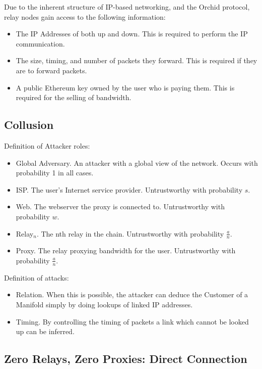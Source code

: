 \documentclass{article}
\newcommand{\mesh}{Orchid}
\begin{document}
Due to the inherent structure of IP-based networking, and the \mesh{} protocol, relay nodes gain access to the following information:

\begin{itemize}
\item The IP Addresses of both up and down. This is required to perform the IP communication.
\item The size, timing, and number of packets they forward. This is required if they are to forward packets.
\item A public Ethereum key owned by the user who is paying them. This is required for the selling of bandwidth.
\end{itemize}

\subsection{Collusion}
\label{sec:collusion}

Definition of Attacker roles:

\begin{itemize}
\item Global Adversary. An attacker with a global view of the network. Occurs with probability 1 in all cases.
\item ISP. The user's Internet service provider. Untrustworthy with probability $s$.
\item Web. The webserver the proxy is connected to. Untrustworthy with probability $w$.
\item Relay$_n$. The nth relay in the chain. Untrustworthy with probability $\frac{a}{n}$.
\item Proxy. The relay proxying bandwidth for the user. Untrustworthy with probability $\frac{a}{n}$.
\end{itemize}

Definition of attacks:

\begin{itemize}
\item Relation. When this is possible, the attacker can deduce the Customer of a Manifold simply by doing lookups of linked IP addresses.
\item Timing. By controlling the timing of packets a link which cannot be looked up can be inferred.
\end{itemize}

\subsection{Zero Relays, Zero Proxies: Direct Connection}
\end{document}
